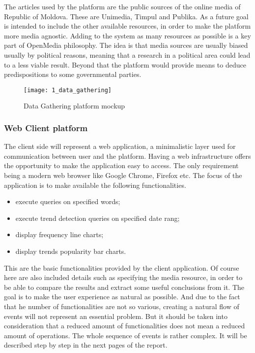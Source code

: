 The articles used by the platform are the public sources of the online media of Republic of Moldova. These are Unimedia, Timpul and Publika. As a future goal is intended to include the other available resources, in order to make the platform more media agnostic. Adding to the system as many resources as possible is a key part of OpenMedia philosophy. The idea is that media sources are usually biased usually by political reasons, meaning that a research in a political area could lead to a less viable result. Beyond that the platform would provide means to deduce predispositions to some governmental parties.

\begin{figure}[!ht]
\centering
\texttt{[image: 1\_data\_gathering]}
\caption{Data Gathering platform mockup}\label{data_gathering_mock}
\end{figure}

\subsubsection{Web Client platform}
The client side will represent a web application, a minimalistic layer used for communication between user and the platform. Having a web infrastructure offers the opportunity to make the application easy to access. The only requirement being a modern web browser like Google Chrome, Firefox etc. The focus of the application is to make available the following functionalities.
\clearpage
\begin{itemize}
    \item execute queries on specified words;
    \item execute trend detection queries on specified date rang;
    \item display frequency line charts;
    \item display trends popularity bar charts.
\end{itemize}

This are the basic functionalities provided by the client application. Of course here are also included details such as specifying the media resource, in order to be able to compare the results and extract some useful conclusions from it. The goal is to make the user experience as natural as possible. And due to the fact that he number of functionalities are not so various, creating a natural flow of events will not represent an essential problem. But it should be taken into consideration that a reduced amount of functionalities does not mean a reduced amount of operations. The whole sequence of events is rather complex. It will be described step by step in the next pages of the report.

